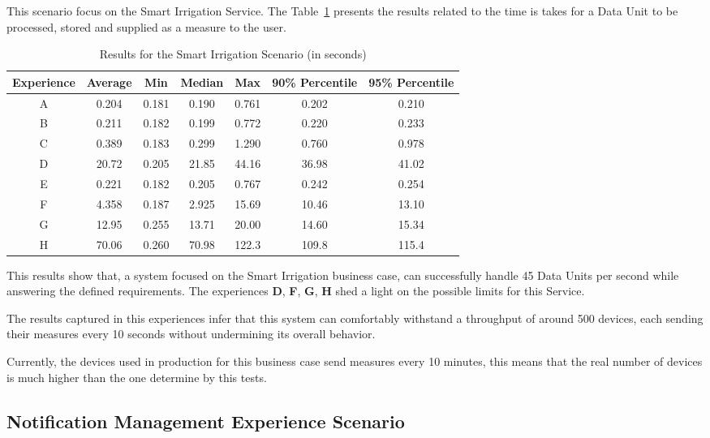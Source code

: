 This scenario focus on the Smart Irrigation Service. The Table~\ref{tab:evaluation:experiences:irrigation:results} presents the results related to the time is takes for a Data Unit to be processed, stored and supplied as a measure to the user.

\begin{table}[H]
    \caption{Results for the Smart Irrigation Scenario (in seconds)}
    \label{tab:evaluation:experiences:irrigation:results}
    \centering
    \begin{tabular}{@{}ccccccc@{}}
    \toprule
    \textbf{Experience} & \textbf{Average} & \textbf{Min} & \textbf{Median} & \textbf{Max} & \textbf{90\% Percentile} & \textbf{95\% Percentile} \\ \midrule
    A & 0.204 & 0.181 & 0.190 & 0.761 & 0.202 & 0.210 \\ \midrule
    B & 0.211 & 0.182 & 0.199 & 0.772 & 0.220 & 0.233 \\ \midrule
    C & 0.389 & 0.183 & 0.299 & 1.290 & 0.760 & 0.978 \\ \midrule
    D & 20.72 & 0.205 & 21.85 & 44.16 & 36.98 & 41.02 \\ \midrule
    E & 0.221 & 0.182 & 0.205 & 0.767 & 0.242 & 0.254 \\ \midrule
    F & 4.358 & 0.187 & 2.925 & 15.69 & 10.46 & 13.10 \\ \midrule
    G & 12.95 & 0.255 & 13.71 & 20.00 & 14.60 & 15.34 \\ \midrule
    H & 70.06 & 0.260 & 70.98 & 122.3 & 109.8 & 115.4 \\ \bottomrule
    \end{tabular}
\end{table}

This results show that, a system focused on the Smart Irrigation business case, can successfully handle 45 Data Units per second while answering the defined requirements. The experiences \textbf{D}, \textbf{F}, \textbf{G}, \textbf{H} shed a light on the possible limits for this Service. 

The results captured in this experiences infer that this system can comfortably withstand a throughput of around 500 devices, each sending their measures every 10 seconds without undermining its overall behavior.

Currently, the devices used in production for this business case send measures every 10 minutes, this means that the real number of devices is much higher than the one determine by this tests.

\subsection{Notification Management Experience Scenario}
\label{subsec:evaluation:experiences:notification}

